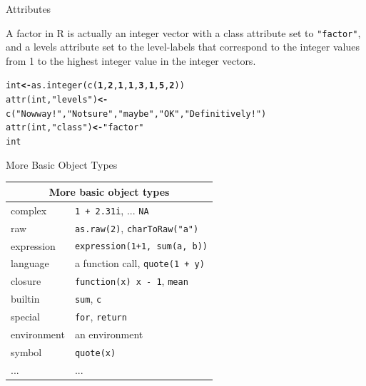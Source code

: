\documentclass{beamer}\usepackage[]{graphicx}\usepackage[]{color}
\makeatletter
\newcommand{\hlnum}[1]{\textcolor[rgb]{0.502,0,0.502}{\textbf{#1}}}%
\newcommand{\hlstr}[1]{\textcolor[rgb]{0.651,0.522,0}{#1}}%
\newcommand{\hlstd}[1]{\textcolor[rgb]{0,0,0}{#1}}%
\newcommand{\hlkwb}[1]{\textcolor[rgb]{0.502,0.502,0.753}{\textbf{#1}}}%
\newcommand{\hlkwd}[1]{\textcolor[rgb]{0,0.267,0.4}{#1}}%
\newenvironment{kframe}{%
 \def\at@end@of@kframe{}%
 \ifinner\ifhmode%
  \def\at@end@of@kframe{\end{minipage}}%
  \begin{minipage}{\columnwidth}%
 \fi\fi%
 \def\FrameCommand##1{\hskip\@totalleftmargin \hskip-\fboxsep
 \colorbox{shadecolor}{##1}\hskip-\fboxsep
     \hskip-\linewidth \hskip-\@totalleftmargin \hskip\columnwidth}%
 \MakeFramed {\advance\hsize-\width
   \@totalleftmargin\z@ \linewidth\hsize
   \@setminipage}}%
 {\par\unskip\endMakeFramed%
 \at@end@of@kframe}
\newenvironment{knitrout}{}{} %
\makeatother
\begin{document}
\begin{frame}[fragile]{Attributes}

A factor in R is actually an integer vector with a class attribute set to \texttt{"factor"}, and a levels attribute set to the level-labels that correspond to the integer values from 1 to the highest integer value in the integer vectors.

\begin{knitrout}
\color{fgcolor}\begin{kframe}
\begin{alltt}
\hlstd{int} \hlkwb{<-} \hlkwd{as.integer}\hlstd{(}\hlkwd{c}\hlstd{(}\hlnum{1}\hlstd{,} \hlnum{2}\hlstd{,} \hlnum{1}\hlstd{,} \hlnum{1}\hlstd{,} \hlnum{3}\hlstd{,} \hlnum{1}\hlstd{,} \hlnum{5}\hlstd{,} \hlnum{2}\hlstd{))}
\hlkwd{attr}\hlstd{(int,} \hlstr{"levels"}\hlstd{)} \hlkwb{<-} \hlkwd{c}\hlstd{(}\hlstr{"Now way!"}\hlstd{,} \hlstr{"Not sure"}\hlstd{,} \hlstr{"maybe"}\hlstd{,} \hlstr{"OK"}\hlstd{,} \hlstr{"Definitively!"}\hlstd{)}
\hlkwd{attr}\hlstd{(int,} \hlstr{"class"}\hlstd{)} \hlkwb{<-} \hlstr{"factor"}
\hlstd{int}
\end{alltt}
\end{kframe}
\end{knitrout}


\end{frame}



\begin{frame}{More Basic Object Types}

\begin{center}
  \begin{tabular}{| l | l |}
    \hline
    \multicolumn{2}{|c|}{More basic object types} \\ \hline
    complex     & \texttt{1 + 2.31i}, ... \texttt{NA} \\ 
    raw         & \texttt{as.raw(2)}, \texttt{charToRaw("a")} \\
    expression  & \texttt{expression(1+1, sum(a, b))} \\ \hline
    language    & a function call, \texttt{quote(1 + y)}  \\
    closure     & \texttt{function(x) x - 1}, \texttt{mean}  \\
    builtin     & \texttt{sum},  \texttt{c} \\
    special     & \texttt{for},  \texttt{return} \\ \hline
    environment & an environment \\
    symbol      & \texttt{quote(x)} \\ \hline
    ...         & ... \\
    \hline
  \end{tabular}
\end{center}

\end{frame}
\end{document}
